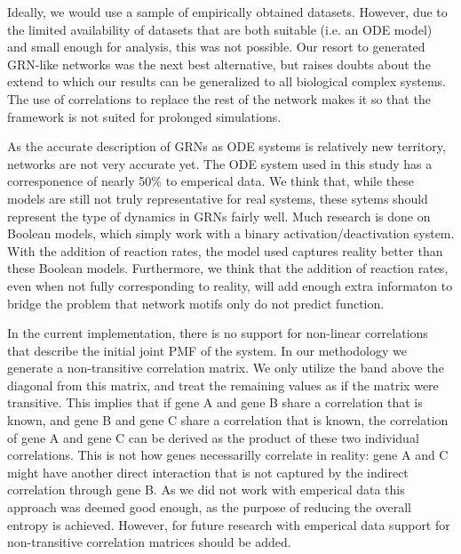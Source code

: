 \documentclass[../main.tex]{subfiles}
\begin{document}
Ideally, we would use a sample of empirically obtained datasets.
However, due to the limited availability of datasets that are both suitable (i.e. an ODE model) and small enough for analysis, this was not possible.
Our resort to generated GRN-like networks was the next best alternative, but raises doubts about the extend to which our results can be generalized to all biological complex systems.
The use of correlations to replace the rest of the network makes it so that the framework is not suited for prolonged simulations.

As the accurate description of GRNs as ODE systems is relatively new territory, networks are not very accurate yet.
The ODE system used in this study has a corresponence of nearly 50\% to emperical data.
We think that, while these models are still not truly representative for real systems, these sytems should represent the type of dynamics in GRNs fairly well.
Much research is done on Boolean models, which simply work with a binary activation/deactivation system.
With the addition of reaction rates, the model used captures reality better than these Boolean models.
Furthermore, we think that the addition of reaction rates, even when not fully corresponding to reality, will add enough extra informaton to bridge the problem that network motifs only do not predict function.

In the current implementation, there is no support for non-linear correlations that describe the initial joint PMF of the system.
In our methodology we generate a non-transitive correlation matrix.
We only utilize the band above the diagonal from this matrix, and treat the remaining values as if the matrix were transitive.
This implies that if gene A and gene B share a correlation that is known, and gene B and gene C share a correlation that is known, the correlation of gene A and gene C can be derived as the product of these two individual correlations.
This is not how genes necessarilly correlate in reality: gene A and C might have another direct interaction that is not captured by the indirect correlation through gene B.
As we did not work with emperical data this approach was deemed good enough, as the purpose of reducing the overall entropy is achieved.
However, for future research with emperical data support for non-transitive correlation matrices should be added.

\end{document}
